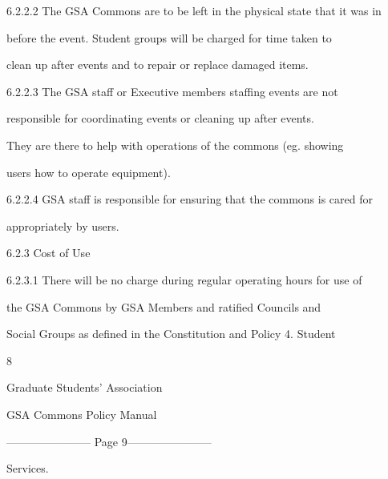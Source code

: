 6.2.2.2   The GSA Commons are to be left in the physical state that it was in  

            before the event. Student groups will be charged for time taken to  

            clean up after events and to repair or replace damaged items.   



  



6.2.2.3   The  GSA  staff  or  Executive  members  staffing  events  are  not  

            responsible  for  coordinating  events  or  cleaning  up  after  events.  

            They are there to help with operations of the commons (eg. showing  

            users how to operate equipment).   



  



6.2.2.4   GSA  staff is responsible for ensuring that the commons is cared for  

            appropriately by users.  



  



         6.2.3  Cost of Use   



  



6.2.3.1   There  will be no charge during  regular  operating  hours  for use  of  

            the  GSA  Commons  by  GSA  Members  and  ratified  Councils  and  

            Social Groups as defined in the  Constitution  and Policy 4. Student  



                                                      8  

                                     

                                   Graduate Students’ Association  

                                   GSA Commons Policy Manual  

  


----------------------- Page 9-----------------------

            Services.  



